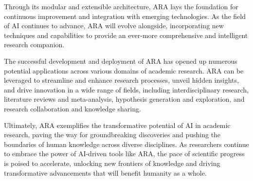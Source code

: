 \documentclass[a4paper,conference]{IEEEtran}
\begin{document}
Through its modular and extensible architecture, ARA lays the foundation for continuous improvement and integration with emerging technologies. As the field of AI continues to advance, ARA will evolve alongside, incorporating new techniques and capabilities to provide an ever-more comprehensive and intelligent research companion.

The successful development and deployment of ARA has opened up numerous potential applications across various domains of academic research. ARA can be leveraged to streamline and enhance research processes, unveil hidden insights, and drive innovation in a wide range of fields, including interdisciplinary research, literature reviews and meta-analysis, hypothesis generation and exploration, and research collaboration and knowledge sharing.

Ultimately, ARA exemplifies the transformative potential of AI in academic research, paving the way for groundbreaking discoveries and pushing the boundaries of human knowledge across diverse disciplines. As researchers continue to embrace the power of AI-driven tools like ARA, the pace of scientific progress is poised to accelerate, unlocking new frontiers of knowledge and driving transformative advancements that will benefit humanity as a whole.
\end{document}
